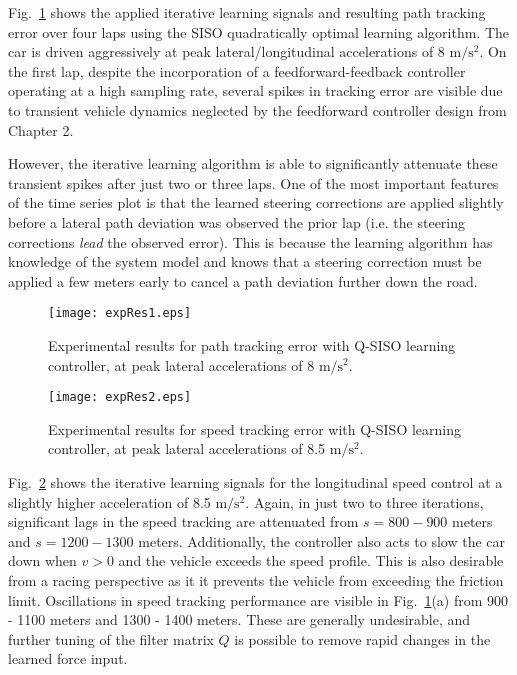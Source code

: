 Fig.~\ref{fig:expRes1} shows the applied iterative learning signals and resulting path tracking error over four laps using the SISO
quadratically optimal learning algorithm. The car is driven
aggressively at peak lateral/longitudinal accelerations of 8 $\mathrm{m/s^2}$. On the first lap, despite the 
incorporation of a feedforward-feedback controller operating at a high sampling rate, several spikes in tracking error are visible due to transient
vehicle dynamics neglected by the feedforward controller design from Chapter 2.

However, the iterative learning algorithm is able to significantly attenuate these transient spikes after just two or three laps. 
One of the most important features of the time series plot is that the learned steering corrections are applied slightly before a lateral
path deviation was observed the prior lap (i.e. the steering corrections \textit{lead} the observed error). This is because the learning
algorithm has knowledge of the system model and knows that a steering correction must be applied a few meters early to cancel a path deviation
further down the road.

\begin{figure}[h!]
\centering
\texttt{[image: expRes1.eps]}
\caption{Experimental results for path tracking error with Q-SISO learning controller, at peak lateral accelerations of 8 $\mathrm{m/s^2}$.}
\label{fig:expRes1}
\end{figure}

\begin{figure}
\centering
\texttt{[image: expRes2.eps]}
\caption{Experimental results for speed tracking error with Q-SISO learning controller, at peak lateral accelerations of 8.5 $\mathrm{m/s^2}$.}
\label{fig:expRes2}
\end{figure}
Fig.~\ref{fig:expRes2} shows the iterative learning signals for the longitudinal speed control at a slightly
higher acceleration of 8.5 $\mathrm{m/s^2}$. Again, in just
two to three iterations, significant lags in the speed tracking are attenuated from $s = 800-900$ meters and $s = 1200-1300$ meters. Additionally, the controller also acts to slow the car down when $v > 0$ and the vehicle exceeds the speed profile. This is also desirable
from a racing perspective as it it prevents the vehicle from exceeding the friction limit. Oscillations in speed tracking
performance are visible in Fig.~\ref{fig:expRes1}(a) from 900 - 1100 meters and 1300 - 1400 meters. These are generally undesirable, and further tuning of the filter matrix $Q$ is possible
to remove rapid changes in the learned force input. 
 
